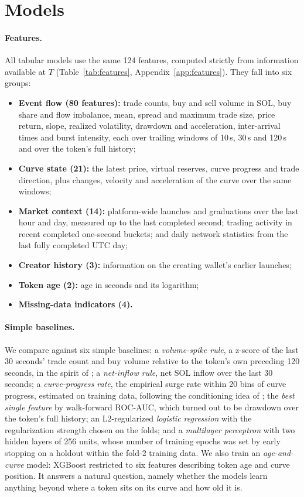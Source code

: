 \section{Models}
\label{sec:models}

\paragraph{Features.}
All tabular models use the same 124 features, computed strictly from information available at $T$ (Table~\ref{tab:features}, Appendix~\ref{app:features}). They fall into six groups:
\begin{itemize}
  \item \textbf{Event flow (80 features):} trade counts, buy and sell volume in SOL, buy share and flow imbalance, mean, spread and maximum trade size, price return, slope, realized volatility, drawdown and acceleration, inter-arrival times and burst intensity, each over trailing windows of 10\,s, 30\,s and 120\,s and over the token's full history;
  \item \textbf{Curve state (21):} the latest price, virtual reserves, curve progress and trade direction, plus changes, velocity and acceleration of the curve over the same windows;
  \item \textbf{Market context (14):} platform-wide launches and graduations over the last hour and day, measured up to the last completed second; trading activity in recent completed one-second buckets; and daily network statistics from the last fully completed UTC day;
  \item \textbf{Creator history (3):} information on the creating wallet's earlier launches;
  \item \textbf{Token age (2):} age in seconds and its logarithm;
  \item \textbf{Missing-data indicators (4).}
\end{itemize}

\paragraph{Simple baselines.}
We compare against six simple baselines: a \emph{volume-spike rule}, a z-score of the last 30 seconds' trade count and buy volume relative to the token's own preceding 120 seconds, in the spirit of \citet{bolz2024realtime}; a \emph{net-inflow rule}, net SOL inflow over the last 30 seconds; a \emph{curve-progress rate}, the empirical surge rate within 20 bins of curve progress, estimated on training data, following the conditioning idea of \citet{marino2026predicting}; the \emph{best single feature} by walk-forward ROC-AUC, which turned out to be drawdown over the token's full history; an L2-regularized \emph{logistic regression} with the regularization strength chosen on the folds; and a \emph{multilayer perceptron} with two hidden layers of 256 units, whose number of training epochs was set by early stopping on a holdout within the fold-2 training data. We also train an \emph{age-and-curve} model: XGBoost restricted to six features describing token age and curve position. It answers a natural question, namely whether the models learn anything beyond where a token sits on its curve and how old it is.


